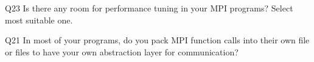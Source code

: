 \begin{description}%
\item{Q23} Is there any room for performance tuning in your MPI programs? Select most suitable one.%
\item{Q21} In most of your programs, do you pack MPI function calls into their own file or files to have your own abstraction layer for communication?%
\end{description}%
